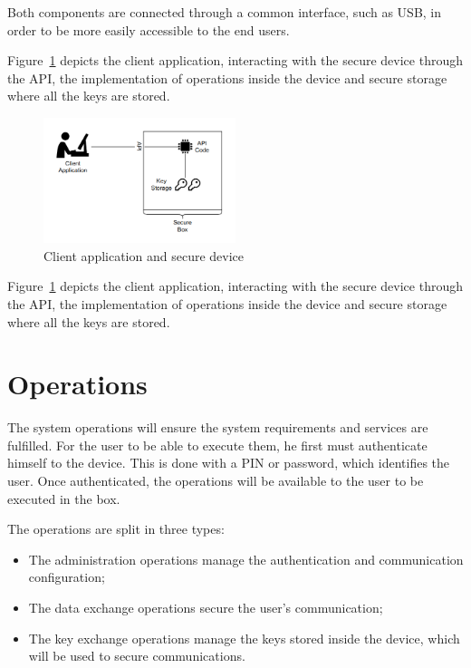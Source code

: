 Both components are connected through a common interface, such as USB, in order to be more easily accessible to the end users.

Figure~\ref{fig:securebox} depicts the client application, interacting with the secure device through the \ac{API}, the implementation of operations inside the device and secure storage where all the keys are stored.

\begin{figure}[h]
    \centering
    \includegraphics[width=0.5\textwidth]{./Images/securebox.png}
    \caption{Client application and secure device}
    \label{fig:securebox}
\end{figure}

Figure~\ref{fig:securebox} depicts the client application, interacting with the secure device through the \ac{API}, the implementation of operations inside the device and secure storage where all the keys are stored.

\section{Operations}\label{chap:arch:ops}

The system operations will ensure the system requirements and services are fulfilled.
For the user to be able to execute them, he first must authenticate himself to the device. This is done with a \ac{PIN} or password, which identifies the user. Once authenticated, the operations will be available to the user to be executed in the box.

The operations are split in three types:
\begin{itemize}
    \item The administration operations manage the authentication and communication configuration;
    \item The data exchange operations secure the user's communication;
    \item The key exchange operations manage the keys stored inside the device, which will be used to secure communications.
\end{itemize}

